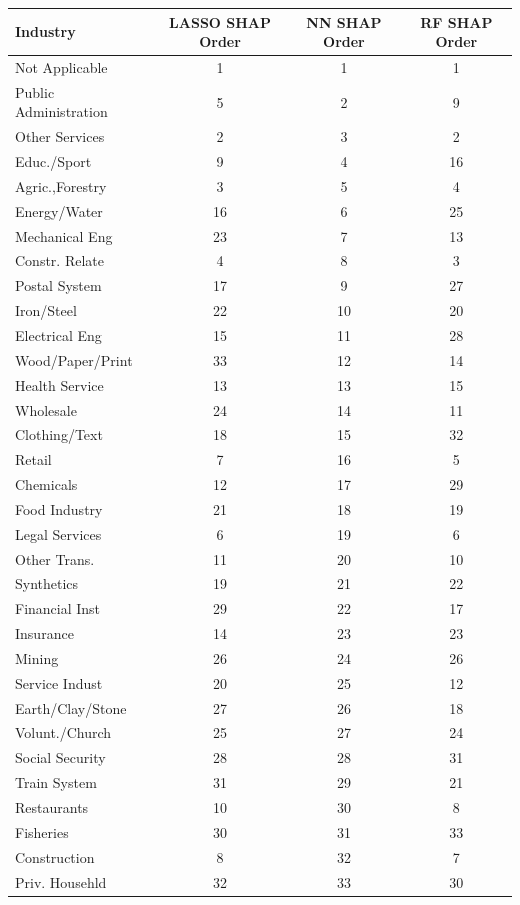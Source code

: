 \begin{tabular}{lccc}
\hline\hline
Industry & LASSO SHAP Order & NN SHAP Order & RF SHAP Order \\
\hline
Not Applicable&1&1&1\\
Public Administration&5&2&9\\
Other Services&2&3&2\\
Educ./Sport&9&4&16\\
Agric.,Forestry&3&5&4\\
Energy/Water&16&6&25\\
Mechanical Eng&23&7&13\\
Constr. Relate&4&8&3\\
Postal System&17&9&27\\
Iron/Steel&22&10&20\\
Electrical Eng&15&11&28\\
Wood/Paper/Print&33&12&14\\
Health Service&13&13&15\\
Wholesale&24&14&11\\
Clothing/Text&18&15&32\\
Retail&7&16&5\\
Chemicals&12&17&29\\
Food Industry&21&18&19\\
Legal Services&6&19&6\\
Other Trans.&11&20&10\\
Synthetics&19&21&22\\
Financial Inst&29&22&17\\
Insurance&14&23&23\\
Mining&26&24&26\\
Service Indust&20&25&12\\
Earth/Clay/Stone&27&26&18\\
Volunt./Church&25&27&24\\
Social Security&28&28&31\\
Train System&31&29&21\\
Restaurants&10&30&8\\
Fisheries&30&31&33\\
Construction&8&32&7\\
Priv. Househld&32&33&30\\
\hline\hline
\end{tabular}
